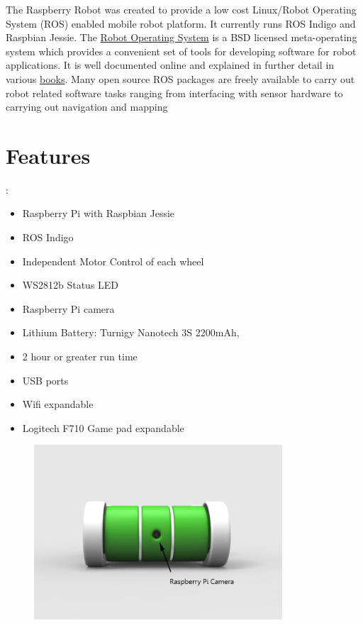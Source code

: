 \documentclass[12pt,titlepage,oneside]{memoir}
\begin{document}
The Raspberry Robot was created to provide a low cost Linux/Robot Operating System (ROS) enabled mobile robot platform. It currently runs ROS Indigo and Raspbian Jessie. The \href{http://wiki.ros.org/ROS/Introduction}{Robot Operating System} is a BSD licensed meta-operating system which provides a convenient set of tools for developing software for robot applications. It is well documented online and explained in further detail in various \href{http://wiki.ros.org/Books}{books}. Many open source ROS packages are freely available to carry out robot related software tasks ranging from interfacing with sensor hardware to carrying out navigation and mapping \\



\section{Features}:
\begin{itemize}
\item Raspberry Pi with Raspbian Jessie
\item ROS Indigo
\item Independent Motor Control of each wheel
\item WS2812b Status LED
\item Raspberry Pi camera
\item Lithium Battery: Turnigy Nanotech 3S 2200mAh,
\item 2 hour or greater run time
\item USB ports
\item Wifi expandable
\item Logitech F710 Game pad expandable
\end{itemize}

\pagebreak
\begin{figure}[!htbp]
\includegraphics[width=350px]{render/pibotfront.jpg}
\centering
\end{figure}
\end{document}

